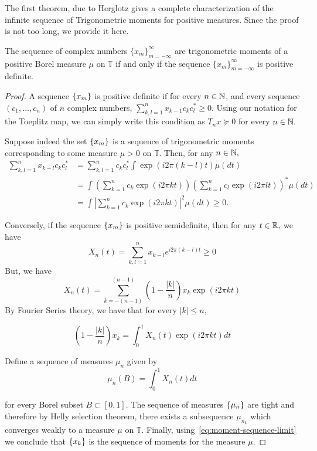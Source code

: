 The first theorem, due to Herglotz gives a complete characterization of the
infinite sequence of Trigonometric moments for positive measures. Since the proof is not too long, we provide it here.
\begin{theorem}\label{thm:herglotz}
	The sequence of complex numbers $\{x_m\}_{m=-\infty}^{\infty}$ are
trigonometric moments of a positive Borel measure $\mu$ on $\mathbb{T}$ if and
only if the sequence $\{x_m\}_{m=-\infty}^{\infty}$ is positive definite.
\end{theorem}
\begin{proof}

A sequence $\left\{ x_m \right\}$ is positive definite if for every $n \in \mathbb{N}$, and every
sequence $(c_1, \ldots, c_n)$ of $n$ complex numbers, $\sum_{k,l=1}^n x_{k-1}
c_k c_l^* \geq 0.$ Using our notation for the Toeplitz map, we can simply write
this condition as $T_n x \succeq 0$ for every $n \in \mathbb{N}.$

Suppose indeed the set $\left\{ x_m \right\}$ is a sequence of trigonometric moments
corresponding to some measure $\mu > 0$ on $\mathbb{T}.$ Then, for any $n \in
\mathbb{N},$
\begin{align*}
	\sum_{k,l=1}^n x_{k-l} c_k c_l^* &= \sum_{k,l=1}^n c_k c_l^* \int \exp(i 2 \pi (k-l) t ) \mu (dt)\\
	&= \int \left(\sum_{k=1}^n c_k \exp(i 2 \pi k t) \right) \left(\sum_{k=1}^n c_l \exp(i 2 \pi l t) \right)^* \mu (dt) \\
	&= \int \left|\sum_{k=1}^n c_k \exp(i 2 \pi k t) \right|^2 \mu (dt) \geq 0.
\end{align*}

Conversely, if the sequence $\left\{ x_m \right\}$ is positive semidefinite, then for any $t \in \mathbb{R},$  we have
\[
X_n(t) = \sum_{k,l=1}^n x_{k-l} e^{i 2 \pi (k-l) t} \geq 0
\]
But, we have
\[
	X_n(t) = \sum_{k=-(n-1)}^{(n-1)} \left( 1 - \frac{|k|}{n}\right) x_k \exp(i 2\pi k t)
\]
By Fourier Series theory, we have that for every $|k| \leq n,$

\begin{equation}
	\label{eq:moment-sequence-limit}
	\left( 1 - \frac{|k|}{n} \right) x_k = \int_0^1 X_n(t) \exp(i 2\pi k t ) d t
\end{equation}

Define a sequence of measures $\mu_n$ given by
\[
	\mu_n(B) = \int_0^1 X_n(t) d t
\]

for every Borel subset $B \subset [0,1].$ The sequence of measures $\left\{ \mu_n \right\}$
are tight and therefore by Helly selection theorem, there exists a subsequence
$\mu_{n_k}$ which converges weakly to a measure $\mu$ on $\mathbb{T}.$ Finally, using~\ref{eq:moment-sequence-limit} we conclude that $\left\{ x_k \right\}$ is the sequence of moments for the measure $\mu.$
\end{proof}

